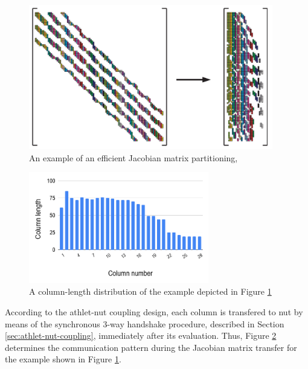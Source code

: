 \begin{figure}[!ht]
  \centering
  \includegraphics[width=0.95\textwidth]{figures/matrix-compression.png}
  \caption[An example of an efficient Jacobian matrix partitioning]{An example of an efficient Jacobian matrix partitioning, \cite{gebremedhin2005color}} \label{fig:matrix-partitioning-example}
\end{figure}


\begin{figure}[!hb]
  \centering
  \includegraphics[width=0.7\textwidth]{figures/matrix-compression-2.png}
  \caption{A column-length distribution of the example depicted in Figure \ref{fig:matrix-partitioning-example}} \label{fig:matrix-column-distribution}
\end{figure}


According to the \acrshort{athlet}-\acrshort{nut} coupling design, each column is transfered to \acrshort{nut} by means of the synchronous 3-way handshake procedure, described in Section \ref{sec:athlet-nut-coupling}, immediately after its evaluation. Thus,  Figure \ref{fig:matrix-column-distribution} determines the communication pattern during the Jacobian matrix transfer for the example shown in Figure \ref{fig:matrix-partitioning-example}.\\


